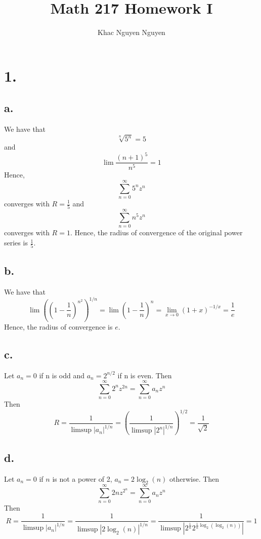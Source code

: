 \documentclass[11pt]{article}
\title{\textbf{Math 217 Homework I}}
\author{Khac Nguyen Nguyen}
\date{}
\begin{document}
\section*{1.}
\subsection*{a.}
We have that 
\[
    \sqrt[n]{5^n} = 5
\]
and 
\[
    \lim \frac{(n+1)^5}{n^5} = 1
\]
Hence, 
\[
    \sum_{n=0}^\infty 5^n z^n    
\]
converges with $R = \frac{1}{5}$ and 
\[
    \sum_{n=0}^\infty n^5 z^n    
\]
converges with $R = 1$. 
Hence, the radius of convergence of the original power series is $\frac{1}{5}$.
\subsection*{b.}
We have that 
\[
    \lim \left(\left( 1- \frac{1}{n} \right)^{n^2} \right)^{1/n} = \lim \left(1- \frac{1}{n} \right)^n = \lim_{x \to 0}(1+x)^{-1/x} = \frac{1}{e}
\]
Hence, the radius of convergence is $e$.
\subsection*{c.}
Let $a_n = 0$ if n is odd and $a_n = 2^{n/2}$ if n is even. Then 
\[
    \sum_{n=0}^\infty 2^n z^{2n} = \sum_{n=0}^\infty a_n z^n     
\]
Then 
\[
    R = \frac{1}{\limsup |a_n|^{1/n}} = \left(\frac{1}{\limsup |2^n|^{1/n}} \right)^{1/2} = \frac{1}{\sqrt{2}}    
\]
\subsection*{d.}
Let $a_n = 0$ if $n$ is not a power of 2, $a_n = 2 \log_2(n)$ otherwise. Then 
\[
    \sum_{n=0}^\infty 2n z^{2^n} = \sum_{n=0}^\infty a_n z^n
\]
Then 
\[
    R = \frac{1}{\limsup |a_n|^{1/n}} = \frac{1}{\limsup|2\log_2(n)|^{1/n}} =  \frac{1}{\limsup|2^{\frac{1}{n}}2^{\frac{1}{n} \log_2(\log_2(n))}| } = 1   
\]
\end{document}
